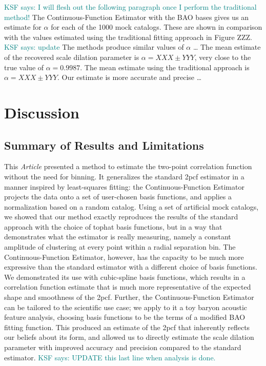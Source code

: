 \documentclass[modern]{aastex62}
\newcommand{\cf}{2pcf\xspace} %
\newcommand{\Est}{The Continuous-Function Estimator\xspace}
\newcommand{\est}{the Continuous-Function Estimator\xspace}
\newcommand{\documentname}{\textsl{Article}\xspace}
\newcommand{\KSF}[1]{\textcolor{teal}{KSF says: #1}}
\begin{document}
\KSF{I will flesh out the following paragraph once I perform the traditional method!}
\Est with the BAO bases gives us an estimate for $\alpha$ for each of the 1000 mock catalogs.
These are shown in comparison with the values estimated using the traditional fitting approach in Figure ZZZ. \KSF{update} 
The methods produce similar values of $\alpha$ \dots 
The mean estimate of the recovered scale dilation parameter is $\alpha=XXX \pm YYY$, very close to the true value of $\alpha = 0.9987$.
The mean estimate using the traditional approach is $\alpha=XXX \pm YYY$.
Our estimate is more accurate and precise \dots 


\section{Discussion} \label{sec:discuss}

\subsection{Summary of Results and Limitations}

This \documentname presented a method to estimate the two-point correlation function without the need for binning.
It generalizes the standard \cf estimator in a manner inspired by least-squares fitting: \est projects the data onto a set of user-chosen basis functions, and applies a normalization based on a random catalog.
Using a set of artificial mock catalogs, we showed that our method exactly reproduces the results of the standard approach with the choice of tophat basis functions, but in a way that demonstrates what the estimator is really measuring, namely a constant amplitude of clustering at every point within a radial separation bin.
\Est, however, has the capacity to be much more expressive than the standard estimator with a different choice of basis functions.
We demonstrated its use with cubic-spline basis functions, which results in a correlation function estimate that is much more representative of the expected shape and smoothness of the \cf.
Further, \est can be tailored to the scientific use case; we apply to it a toy baryon acoustic feature analysis, choosing basis functions to be the terms of a modified BAO fitting function.
This produced an estimate of the \cf that inherently reflects our beliefs about its form, and allowed us to directly estimate the scale dilation parameter with improved accuracy and precision compared to the standard estimator. \KSF{UPDATE this last line when analysis is done.}
\end{document}
